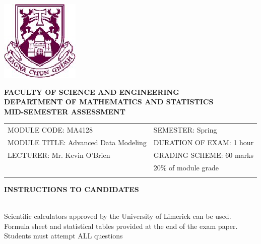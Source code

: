 \documentclass[a4paper,12pt]{article}
\begin{document}
\begin{center}
       \includegraphics[scale=0.55]{shieldtransparent2}
\end{center}

\begin{center}
\vspace{1cm}
\large \bf {FACULTY OF SCIENCE AND ENGINEERING} \\[0.5cm]
\normalsize DEPARTMENT OF MATHEMATICS AND STATISTICS \\[1.25cm]
\large \bf {MID-SEMESTER ASSESSMENT} \\[1.5cm]
\end{center}

\begin{tabular}{ll}
MODULE CODE: MA4128 & SEMESTER: Spring \\[1cm]
MODULE TITLE: Advanced Data Modeling & DURATION OF EXAM: 1 hour \\[1cm]
LECTURER: Mr. Kevin O'Brien & GRADING SCHEME: 60 marks \\
& \phantom{GRADING SCHEME:} \footnotesize {20\% of module grade} \\[0.8cm]
\\[1cm]
\end{tabular}
\begin{center}
{\bf INSTRUCTIONS TO CANDIDATES}
\end{center}

{\noindent \\ Scientific calculators approved by the University of Limerick can be used. \\
Formula sheet and statistical tables provided at the end of the exam paper.\\
Students must attempt ALL questions}
\newpage



\end{document}
